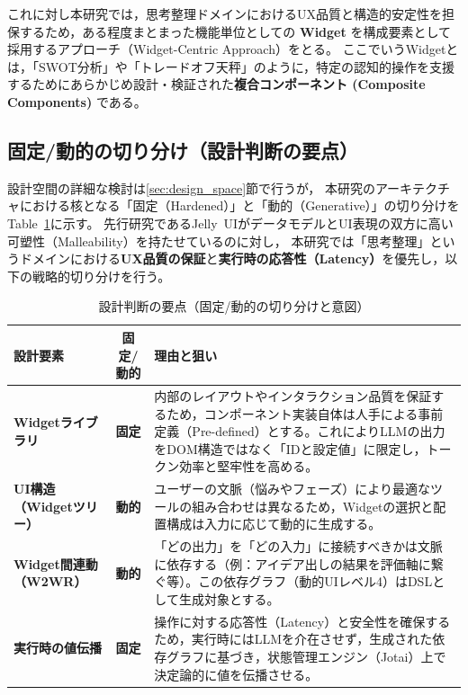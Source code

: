 \documentclass[senior,final,11pt,dvipdfmx]{iputit-thesis}
\begin{document}
これに対し本研究では，思考整理ドメインにおけるUX品質と構造的安定性を担保するため，ある程度まとまった機能単位としての \textbf{Widget} を構成要素として採用するアプローチ（Widget-Centric Approach）をとる。
ここでいうWidgetとは，「SWOT分析」や「トレードオフ天秤」のように，特定の認知的操作を支援するためにあらかじめ設計・検証された\textbf{複合コンポーネント (Composite Components)} である。


\subsection{固定/動的の切り分け（設計判断の要点）}
\label{sec:design_decision_summary}

設計空間の詳細な検討は\ref{sec:design_space}節で行うが，
本研究のアーキテクチャにおける核となる「固定（Hardened）」と「動的（Generative）」の切り分けをTable~\ref{tab:design_decision_beta21}に示す。
先行研究であるJelly~UI\cite{cao2025jelly}がデータモデルとUI表現の双方に高い可塑性（Malleability）を持たせているのに対し，
本研究では「思考整理」というドメインにおける\textbf{UX品質の保証}と\textbf{実行時の応答性（Latency）}を優先し，以下の戦略的切り分けを行う。

\begin{table}[!t]
\caption{設計判断の要点（固定/動的の切り分けと意図）}
\label{tab:design_decision_beta21}
\centering
\small
\begin{tabular}{l|c|p{6.5cm}} \toprule
設計要素 & 固定/動的 & 理由と狙い \\ \midrule
\textbf{Widgetライブラリ} & \textbf{固定} &
内部のレイアウトやインタラクション品質を保証するため，コンポーネント実装自体は人手による事前定義（Pre-defined）とする。これによりLLMの出力をDOM構造ではなく「IDと設定値」に限定し，トークン効率と堅牢性を高める。\\ \hline
\textbf{UI構造（Widgetツリー）} & \textbf{動的} &
ユーザーの文脈（悩みやフェーズ）により最適なツールの組み合わせは異なるため，Widgetの選択と配置構成は入力に応じて動的に生成する。\\ \hline
\textbf{Widget間連動（W2WR）} & \textbf{動的} &
「どの出力」を「どの入力」に接続すべきかは文脈に依存する（例：アイデア出しの結果を評価軸に繋ぐ等）。この依存グラフ（動的UIレベル4）はDSLとして生成対象とする。\\ \hline
\textbf{実行時の値伝播} & \textbf{固定} &
操作に対する応答性（Latency）と安全性を確保するため，実行時にはLLMを介在させず，生成された依存グラフに基づき，状態管理エンジン（Jotai）上で決定論的に値を伝播させる。\\
\bottomrule
\end{tabular}
\end{table}
\end{document}
